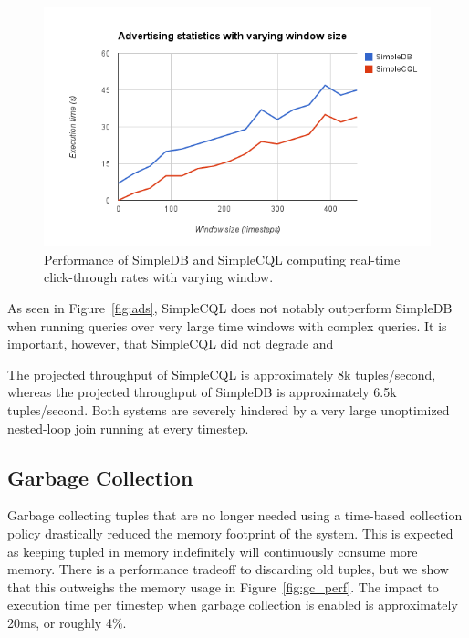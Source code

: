 \documentclass[a4paper, 10pt, conference]{IEEEconf}
\begin{document}
\begin{figure}[h!]
    \centering
    \centerline{\includegraphics[totalheight=5cm]{ads_window.png}}
    \caption{Performance of SimpleDB and SimpleCQL computing real-time click-through rates with varying window.}
    \label{fig:ads_window}
\end{figure}

As seen in Figure~\ref{fig:ads}, SimpleCQL does not notably outperform SimpleDB when running queries over very large time windows with complex queries.  It is important, however, that SimpleCQL did not degrade and 

The projected throughput of SimpleCQL is approximately 8k tuples/second, whereas the projected throughput of SimpleDB is approximately 6.5k tuples/second.  Both systems are severely hindered by a very large unoptimized nested-loop join running at every timestep.

\subsection{Garbage Collection}
Garbage collecting tuples that are no longer needed using a time-based collection policy drastically reduced the memory footprint of the system.  This is expected as keeping tupled in memory indefinitely will continuously consume more memory.  There is a performance tradeoff to discarding old tuples, but we show that this outweighs the memory usage in Figure~\ref{fig:gc_perf}.  The impact to execution time per timestep when garbage collection is enabled is approximately 20ms, or roughly 4\%.
\end{document}
